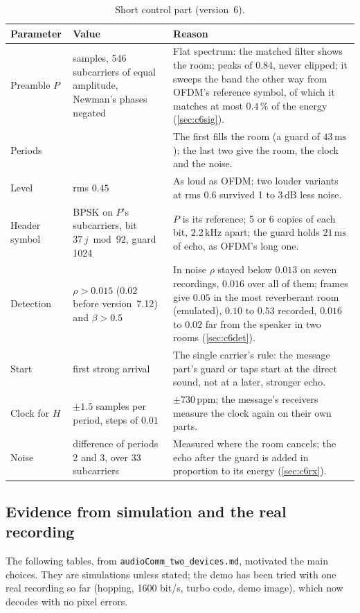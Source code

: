 \documentclass[11pt,a4paper]{article}
\newcommand{\kHz}{\,\mathrm{kHz}}
\newcommand{\ms}{\,\mathrm{ms}}
\newcommand{\dB}{\,\mathrm{dB}}
\newcommand{\code}[1]{\texttt{#1}}
\theoremstyle{remark}
\begin{document}
\begin{table}[ht]
\centering
\caption{Short control part (version~6).}
\label{tab:pc6}
\small
\begin{tabularx}{\linewidth}{>{\raggedright\arraybackslash}p{3.4cm}>{\raggedright\arraybackslash}p{3.1cm}X}
\toprule
Parameter & Value & Reason\\
\midrule
Preamble $P$ & 2048 samples, 546 subcarriers of equal amplitude, Newman's phases negated & Flat spectrum: the matched filter shows the room; peaks of $0.84$, never clipped; it sweeps the band the other way from OFDM's reference symbol, of which it matches at most $0.4\,\%$ of the energy (\cref{sec:c6sig}).\\
Periods & 3 & The first fills the room (a guard of $43\ms$); the last two give the room, the clock and the noise.\\
Level & rms $0.45$ & As loud as OFDM; two louder variants at rms $0.6$ survived 1 to $3\dB$ less noise.\\
Header symbol & BPSK on $P$'s subcarriers, bit $37\,j \bmod 92$, guard 1024 & $P$ is its reference; 5 or 6 copies of each bit, $2.2\kHz$ apart; the guard holds $21\ms$ of echo, as OFDM's long one.\\
Detection & $\rho > 0.015$ ($0.02$ before version~7.12) and $\beta > 0.5$ & In noise $\rho$ stayed below $0.013$ on seven recordings, $0.016$ over all of them; frames give $0.05$ in the most reverberant room (emulated), $0.10$ to $0.53$ recorded, $0.016$ to $0.02$ far from the speaker in two rooms (\cref{sec:c6det}).\\
Start & first strong arrival & The single carrier's rule: the message part's guard or taps start at the direct sound, not at a later, stronger echo.\\
Clock for $H$ & $\pm 1.5$ samples per period, steps of $0.01$ & $\pm 730$\,ppm; the message's receivers measure the clock again on their own parts.\\
Noise & difference of periods 2 and 3, over 33 subcarriers & Measured where the room cancels; the echo after the guard is added in proportion to its energy (\cref{sec:c6rx}).\\
\bottomrule
\end{tabularx}
\end{table}

\subsection{Evidence from simulation and the real recording}
\label{sec:results}
The following tables, from \code{audioComm\_two\_devices.md}, motivated the main choices. They are simulations unless stated; the demo has been tried with one real recording so far (hopping, 1600 bit/s, turbo code, demo image), which now decodes with no pixel errors.
\end{document}
